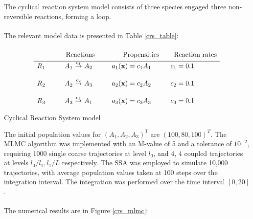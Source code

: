 \documentclass[ugrad,lot,lof,openright,11pt,oneside,onehalfspace]{RUthesis}
\begin{document}
			The cyclical reaction system model \cite{chem_phys_models} consists of three species engaged three non-reversible reactions, forming a loop.\\
			\\
			The relevant model data is presented in Table \ref{crs_table}:

			\begin{table}[H]
			\[
			\begin{array}{l@{\hspace*{10mm}}r@{\ }c@{\ }l@{\hspace*{10mm}}l@{\hspace*{10mm}}l}
			\multicolumn{4}{c}{\text{{\huge\phantom{$I_{I_I}$}}Reactions}} & \multicolumn{1}{c}{\text{Propensities}} & \multicolumn{1}{c}{\text{Reaction rates}}\\
			\hline
			R_1 	& A_1 & \stackrel{c_1}{\rightarrow} & A_2 		& a_1(\mathbf{x}) = c_1 A_1 	& c_1 = 0.1
			\\\\
			R_2 	& A_2 & \stackrel{c_2}{\rightarrow} & A_3 		& a_2(\mathbf{x}) = c_2 A_2 	& c_2 = 0.1
			\\\\
			R_3 	& A_3 & \stackrel{c_3}{\rightarrow} & A_1 		& a_3(\mathbf{x}) = c_3 A_3 	& c_3 = 0.1
			\end{array}
			\]
			\captionsetup{width=0.8\textwidth}
			\caption{Cyclical Reaction System model}
			\label{crs_table}
			\end{table}

			\noindent
			The initial population values for $(A_1,A_2,A_3)^T$ are $(100,80,100)^T$. The MLMC algorithm was implemented with an M-value of 5 and a tolerance of $10^{-2}$, requiring 1000 single coarse trajectories at level $l_0$, and 4, 4 coupled trajectories at levels $l_0/l_1,l_1/L$ respectively. The SSA was employed to simulate 10,000 trajectories, with average population values taken at 100 steps over the integration interval. The integration was performed over the time interval $[0,20]$.\\
			\\
			The numerical results are in Figure \ref{crs_mlmc}:
\end{document}
